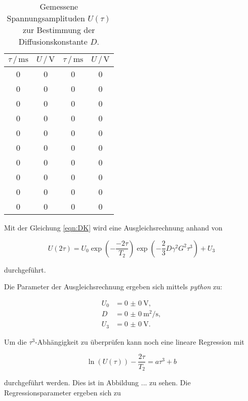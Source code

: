 \begin{table}
  \centering
  \caption{Gemessene Spannungsamplituden $U\left(\tau\right)$ zur Bestimmung der Diffusionskonstante $D$.}
  \label{tab:mess3}
  \begin{tabular}{c c c c}
  \toprule
  $\tau \,/\, \si{\milli\second}$ & $U \,/\, \si{\volt}$ & $\tau \,/\, \si{\milli\second}$
  & $U \,/\, \si{\volt}$\\
  \midrule 
      0 & 0 & 0 & 0\\
      0 & 0 & 0 & 0\\
      0 & 0 & 0 & 0\\
      0 & 0 & 0 & 0\\
      0 & 0 & 0 & 0\\
      0 & 0 & 0 & 0\\
      0 & 0 & 0 & 0\\
      0 & 0 & 0 & 0\\
      0 & 0 & 0 & 0\\
      0 & 0 & 0 & 0\\
  \bottomrule
  \end{tabular}
\end{table}

Mit der Gleichung \eqref{eqn:DK} wird eine Ausgleichsrechnung anhand von 

\begin{equation*}
  U\left(2\tau\right) = U_0 \exp{\left(-\frac{-2\tau}{T_2}\right)} \exp{\left(-\frac{2}{3}D\gamma^2G^2\tau^3\right)} + U_3
\end{equation*}

durchgeführt. 




Die Parameter der Ausgleichsrechnung ergeben sich mittels \textit{python} zu:

\begin{align}
  U_0 &= \SI{0(0)}{\volt},\\
  D &= \SI{0(0)}{\metre^2\per\second},\\
  U_3 &= \SI{0(0)}{\volt}.
\end{align}

Um die $\tau^3$-Abhängigkeit zu überprüfen kann noch eine lineare Regression mit 

\begin{equation}
  \ln{\left(U\left(\tau\right)\right)}-\frac{2\tau}{T_2} = a\tau^3+b
\end{equation}

durchgeführt werden. Dies ist in Abbildung ... zu sehen. Die Regressionsparameter ergeben sich zu 

